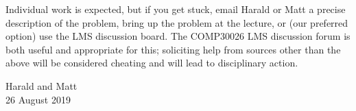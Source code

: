 \documentclass[12pt]{article}
\begin{document}
Individual work is expected, but if you get stuck, email Harald or Matt
a precise description of the problem, bring up the problem at the
lecture, or (our preferred option) use the LMS discussion board.
The COMP30026 LMS discussion forum is both useful and appropriate
for this;
soliciting help from sources other than the above
will be considered cheating and will lead to disciplinary action.

\begin{flushright}
Harald and Matt 
\\ 26 August 2019
\end{flushright}
\end{document}
